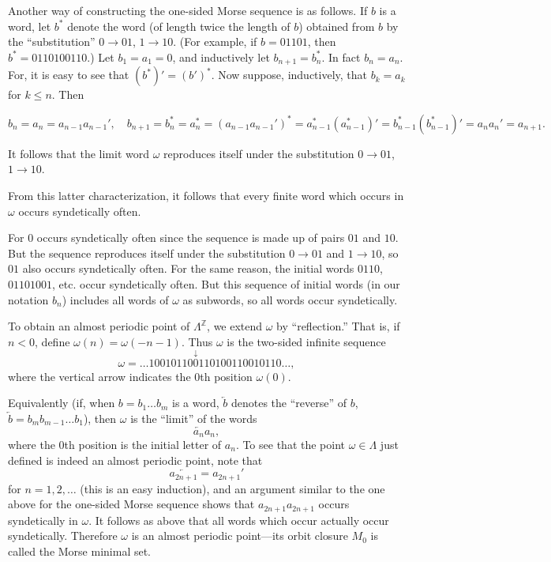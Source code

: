 Another way of constructing the one-sided Morse sequence is as follows. If $b$ is a word, let $b^*$ denote the word (of length twice the length of $b$) obtained from $b$ by the “substitution” $0 \to 01$, $1 \to 10$. (For example, if $b = 01101$, then $b^* = 0110100110$.) Let $b_1 = a_1 = 0$, and inductively let $b_{n+1} = b_n^*$. In fact $b_n = a_n$. For, it is easy to see that $(b^*)' = (b')^*$. Now suppose, inductively, that $b_k = a_k$ for $k \le n$. Then

\[
    b_n = a_n = a_{n-1} a_{n-1}', \quad b_{n+1} = b_n^* = a_n^* = (a_{n-1} a_{n-1}')^* = a_{n-1}^* (a_{n-1}^*)' = b_{n-1}^* (b_{n-1}^*)' = a_n a_n' = a_{n+1}.
\]

It follows that the limit word $\omega$ reproduces itself under the substitution $0 \to 01$, $1 \to 10$.

From this latter characterization, it follows that every finite word which occurs in $\omega$ occurs syndetically often.

For $0$ occurs syndetically often since the sequence is made up of pairs $01$ and $10$. But the sequence reproduces itself under the substitution $0 \to 01$ and $1 \to 10$, so $01$ also occurs syndetically often. For the same reason, the initial words $0110$, $01101001$, etc. occur syndetically often. But this sequence of initial words (in our notation $b_n$) includes all words of $\omega$ as subwords, so all words occur syndetically.


To obtain an almost periodic point of $\Lambda^{\mathbb{Z}}$, we extend $\omega$ by “reflection.” That is, if $n < 0$, define $\omega(n) = \omega(-n - 1)$. Thus $\omega$ is the two-sided infinite sequence
\[
    \omega = \ldots10010110\overset{\downarrow}{0}110100110010110\ldots,
\]
where the vertical arrow indicates the 0th position $\omega(0)$.

Equivalently (if, when $b = b_1 \ldots b_m$ is a word, $\overleftarrow{b}$ denotes the “reverse” of $b$, $\overleftarrow{b} = b_m b_{m-1} \ldots b_1$), then $\omega$ is the “limit” of the words
\[
    \overleftarrow{a_n} a_n,
\]
where the 0th position is the initial letter of $a_n$. To see that the point $\omega \in \Lambda$ just defined is indeed an almost periodic point, note that
\[
    \overleftarrow{a_{2n+1}} = a_{2n+1}'
\]
for $n = 1,2,\ldots$ (this is an easy induction), and an argument similar to the one above for the one-sided Morse sequence shows that $a_{2n+1} a_{2n+1}$ occurs syndetically in $\omega$. It follows as above that all words which occur actually occur syndetically. Therefore $\omega$ is an almost periodic point—its orbit closure $M_0$ is called the Morse minimal set.

